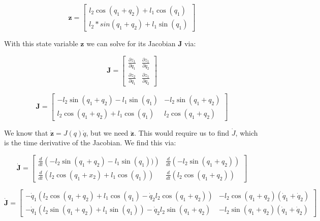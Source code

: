 \documentclass{article}
\begin{document}
\begin{equation}
    \boldsymbol{z} = \begin{bmatrix}
        l_2 \cos(q_1+q_2) + l_1 \cos(q_1) \\
        l_2 * sin(q_1 + q_2) + l_1 \sin(q_1)
    \end{bmatrix}
\end{equation}

With this state variable $\boldsymbol{z}$ we can solve for its Jacobian $\boldsymbol{J}$ via:

\begin{equation}
    \boldsymbol{J} = \begin{bmatrix}
        \frac{\partial z_1}{\partial q_1} & \frac{\partial z_1}{\partial q_2} \\[1em]
        \frac{\partial z_2}{\partial q_1} & \frac{\partial z_1}{\partial q_2}
    \end{bmatrix}
\end{equation}

\begin{equation}
    \boldsymbol{J} = \begin{bmatrix}
        -l_2 \sin(q_1 + q_2) - l_1 \sin(q_1) & -l_2 \sin(q_1 + q_2) \\
        l_2 \cos(q_1 + q_2) + l_1 \cos(q_1) & l_2 \cos(q_1 + q_2)
    \end{bmatrix}
\end{equation}

We know that $\boldsymbol{\dot{z}} = J(q) \dot{q}$, but we need $\boldsymbol{\ddot{z}}$. This would require us to find $\dot{J}$, which is the time derivative of the Jacobian. We find this via:

\begin{equation}
    \boldsymbol{\dot{J}} = \begin{bmatrix}
        \frac{d}{dt} \left( -l_2 \sin(q_1 + q_2) - l_1 \sin(q_1))\right) & \frac{d}{dt} \left( -l_2 \sin(q_1 + q_2)\right) \\
        \frac{d}{dt} \left( l_2 \cos(q_1 + x_2) + l_1 \cos(q_1)\right) & \frac{d}{dt} \left( l_2 \cos(q_1 + q_2) \right)
    \end{bmatrix}
\end{equation}

\begin{equation}
    \boldsymbol{\dot{J}} = \begin{bmatrix}
        -\dot{q}_1 (l_2 \cos(q_1 + q_2) + l_1 \cos(q_1) - \dot{q}_2 l_2 \cos(q_1 + q_2)) &  -l_2 \cos(q_1 +q_2)(\dot{q}_1 + \dot{q}_2) \\
        - \dot{q}_1 (l_2 \sin(q_1 + q_2) + l_1 \sin(q_1)) - \dot{q}_2 l_2 \sin(q_1 + q_2) & -l_2 \sin(q_1 +q_2) (\dot{q}_1 + \dot{q}_2)
    \end{bmatrix}
\end{equation}
     
\end{document}
